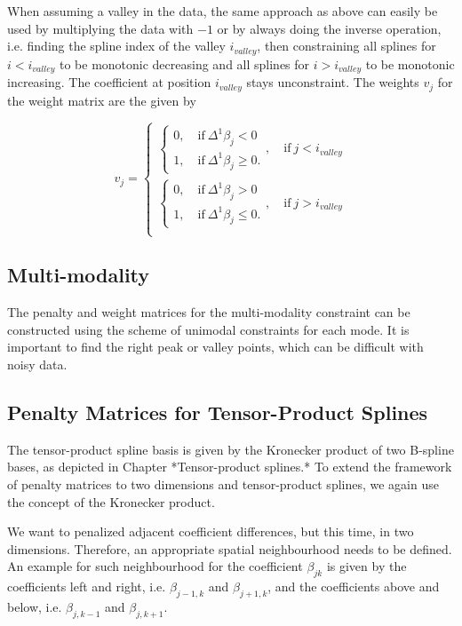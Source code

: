 \documentclass[10pt,a4paper]{article}
\begin{document}
	When assuming a valley in the data, the same approach as above can easily be used by multiplying the data with $-1$ or by always doing the inverse operation, i.e. finding the spline index of the valley $i_{valley}$, then constraining all splines for $i < i_{valley}$ to be monotonic decreasing and all splines for $i > i_{valley}$ to be monotonic increasing. The coefficient at position $i_{valley}$ stays unconstraint. The weights $v_j$ for the weight matrix are the given by
	
	$$v_j = \begin{cases}\begin{cases} 0, \quad \text{if} \ \Delta^1\beta_j < 0 \\ 
	1, \quad \text{if} \ \Delta^1\beta_j \ge 0.\end{cases}  , \quad \text{if} \ j < i_{valley}  \\ \begin{cases} 0, \quad \text{if} \ \Delta^1\beta_j > 0 \\ 
	1, \quad \text{if} \ \Delta^1\beta_j \le 0.\end{cases}, \quad \text{if} \ j > i_{valley} \\ \end{cases}$$
	
	\subsection{Multi-modality} 
	
	The penalty and weight matrices for the multi-modality constraint can be constructed using the scheme of unimodal constraints for each mode. It is important to find the right peak or valley points, which can be difficult with noisy data. 
	
	\subsection{Penalty Matrices for Tensor-Product Splines}
	
	The tensor-product spline basis is given by the Kronecker product of two B-spline bases, as depicted in Chapter *Tensor-product splines.* To extend the framework of penalty matrices to two dimensions and tensor-product splines, we again use the concept of the Kronecker product. 
	
	We want to penalized adjacent coefficient differences, but this time, in two dimensions. Therefore, an appropriate spatial neighbourhood needs to be defined. An example for such neighbourhood for the coefficient $\beta_{jk}$ is given by the coefficients left and right, i.e. $\beta_{j-1, k}$ and $\beta_{j+1, k}$, and the coefficients above and below, i.e. $\beta_{j, k-1}$ and $\beta_{j,k+1}$. 
	
\end{document}
